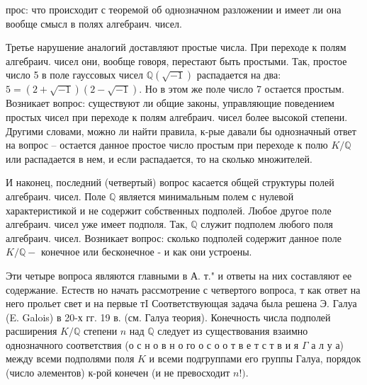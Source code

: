 \documentclass[10pt]{article}
\begin{document}
прос: что происходит с теоремой об однозначном разложении и имеет ли она вообще смысл в полях алгебраич. чисел.



Третье нарушение аналогий доставляют простые числа. При переходе к полям алгебраич. чисел они, вообще говоря, перестают быть простыми. Так, простое число 5 в поле гауссовых чисел $\mathbb{Q}(\sqrt{-1})$ распадается на два: $5=(2+\sqrt{-1})(2-\sqrt{-1})$. Но в этом же поле число 7 остается простым. Возникает вопрос: существуют ли общие законы, управляющие поведением простых чисел при переходе к полям алгебраич. чисел более высокой степени. Другими словами, можно ли найти правила, к-рые давали бы однозначный ответ на вопрос -- остается данное простое число простым при переходе к полю $K / \mathbb{Q}$ или распадается в нем, и если распадается, то на сколько множителей.



И наконец, последний (четвертый) вопрос касается общей структуры полей алгебраич. чисел. Поле $\mathbb{Q}$ является минимальным полем с нулевой характеристикой и не содержит собственных подполей. Любое другое поле алгебраич. чисел уже имеет подполя. Так, $\mathbb{Q}$ служит подполем любого поля алгебраич. чисел. Возникает вопрос: сколько подполей содержит данное поле $K / \mathbb{Q}-$ конечное или бесконечное - и как они устроены.



Эти четыре вопроса являются главными в А. т." и ответы на них составляют ее содержание. Естеств но начать рассмотрение с четвертого вопроса, т как ответ на него прольет свет и на первые тI Соответствующая задача была решена Э. Галуа (E. Galois) в 20-х гг. 19 в. (см. Галуа теория). Конечность числа подполей расширения $K / \mathbb{Q}$ степени $n$ над $\mathbb{Q}$ следует из существования взаимно однозначного соответствия (о с н о в н о го $о$ с о о т в е т с т в и я $\Gamma$ а л у а) между всеми подполями поля $K$ и всеми подгруппами его группы Галуа, порядок (число әлементов) к-рой конечен (и не превосходит $n !)$.
\end{document}
